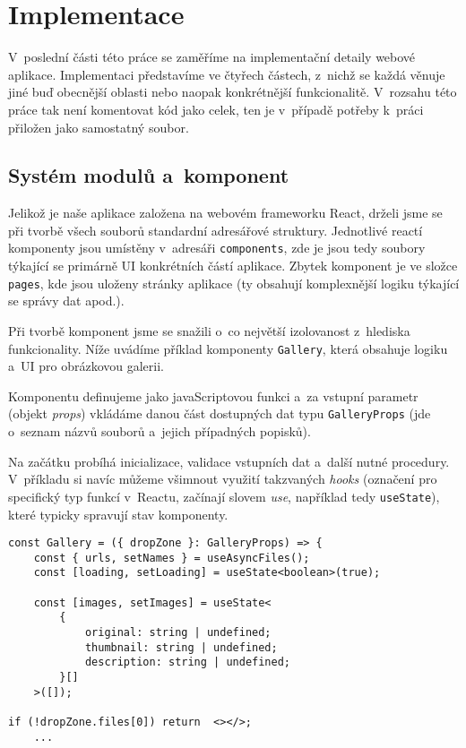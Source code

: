 \hypertarget{implementace}{%
\chapter{Implementace}\label{implementace}}

V~poslední části této práce se zaměříme na implementační detaily webové aplikace. Implementaci představíme ve čtyřech částech, z~nichž se každá věnuje jiné buď obecnější oblasti nebo naopak konkrétnější funkcionalitě. V~rozsahu této práce tak není komentovat kód jako celek, ten je v~případě potřeby k~práci přiložen jako samostatný soubor.

\hypertarget{systuxe9m-modulux16f-a-komponent}{%
\section{Systém modulů a~komponent}\label{systuxe9m-modulux16f-a-komponent}}

Jelikož je naše aplikace založena na webovém frameworku React, drželi jsme se při tvorbě všech souborů standardní adresářové struktury. Jednotlivé reactí komponenty jsou umístěny v~adresáři \verb|components|, zde je jsou tedy soubory týkající se primárně UI konkrétních částí aplikace. Zbytek komponent je ve složce \verb|pages|, kde jsou uloženy stránky aplikace (ty obsahují komplexnější logiku týkající se správy dat apod.).


Při tvorbě komponent jsme se snažili o~co největší izolovanost z~hlediska funkcionality. Níže uvádíme příklad komponenty \verb|Gallery|, která obsahuje logiku a~UI pro obrázkovou galerii.

Komponentu definujeme jako javaScriptovou funkci a~za vstupní parametr (objekt \emph{props}) vkládáme danou část dostupných dat typu \verb|GalleryProps| (jde o~seznam názvů souborů a~jejich případných popisků).

Na začátku probíhá inicializace, validace vstupních dat a~další nutné procedury. V~příkladu si navíc můžeme všimnout využití takzvaných \emph{hooks} (označení pro specifický typ funkcí v~Reactu, začínají slovem \emph{use}, například tedy \verb|useState|), které typicky spravují stav komponenty.

\begin{verbatim}
const Gallery = ({ dropZone }: GalleryProps) => {
    const { urls, setNames } = useAsyncFiles();
    const [loading, setLoading] = useState<boolean>(true);
    
    const [images, setImages] = useState<
        {
            original: string | undefined;
            thumbnail: string | undefined;
            description: string | undefined;
        }[]
    >([]);
    
if (!dropZone.files[0]) return  <></>;
    ...
\end{verbatim}

